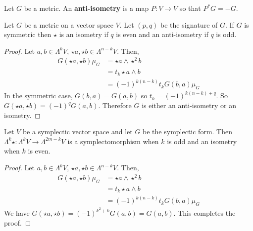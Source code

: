 \begin{defn}
Let $G$ be a metric. An \textbf{anti-isometry} is a map $P : V\to V$ so that $P^* G = -G$.
\end{defn}
\begin{cor}
Let $G$ be a metric on a vector space $V$. Let $(p,q)$ be the signature of $G$. If $G$ is symmetric then $\star$ is an isometry if $q$ is even and an anti-isometry if $q$ is odd.
\end{cor}
\begin{proof}
    Let $a,b\in\Lambda^k V$, $\star a,\star b \in \Lambda^{n-k}V$. Then,
    \begin{align*}
        G(\star a,\star b)\mu_G  &= \star a \wedge \star^2 b\\
        &= t_k \star a \wedge b \\
        &= (-1)^{k(n-k)}t_k G(b,a)\mu_G
    \end{align*}
    In the symmetric case, $G(b,a)=G(a,b)$ so $t_k = (-1)^{k(n-k)+q}$. So $G(\star a,\star b) = (-1)^q G(a,b)$. Therefore $G$ is either an anti-isometry or an isometry.
\end{proof}
\begin{cor}
Let $V$ be a symplectic vector space and let $G$ be the symplectic form. Then $\Lambda^k\star : \Lambda^k V \to \Lambda^{2m-k}V$ is a symplectomorphism when $k$ is odd and an isometry when $k$ is even.
\end{cor}
\begin{proof}
    Let $a,b\in\Lambda^k V$, $\star a,\star b \in \Lambda^{n-k}V$. Then,
    \begin{align*}
        G(\star a,\star b)\mu_G  &= \star a \wedge \star^2 b\\
        &= t_k \star a \wedge b \\
        &= (-1)^{k(n-k)}t_k G(b,a)\mu_G
    \end{align*}
    We have $G(\star a,\star b) = (-1)^{k^2 + k}G(a,b) = G(a,b)$. This completes the proof.
\end{proof}
